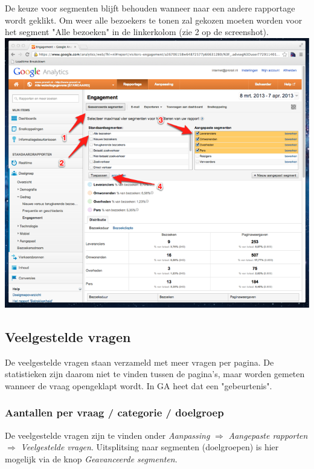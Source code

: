 De keuze voor segmenten blijft behouden wanneer naar een andere rapportage wordt geklikt. Om weer alle bezoekers te tonen zal gekozen moeten worden voor het segment "Alle bezoeken" in de linkerkolom (zie 2 op de screenshot).
\\

\includegraphics[width=\textwidth]{img/stats6.png}

\clearpage
\subsection{Veelgestelde vragen}
De veelgestelde vragen staan verzameld met meer vragen per pagina. De statistieken zijn daarom niet te vinden tussen de pagina's, maar worden gemeten wanneer de vraag opengeklapt wordt. In GA heet dat een "gebeurtenis".


\subsubsection{Aantallen per vraag / categorie / doelgroep}
De veelgestelde vragen zijn te vinden onder \emph{Aanpassing} $\Rightarrow$ \emph{Aangepaste rapporten} $\Rightarrow$ \emph{Veelgestelde vragen}. Uitsplitsing naar segmenten (doelgroepen) is hier mogelijk via de knop \emph{Geavanceerde segmenten}.
\\

